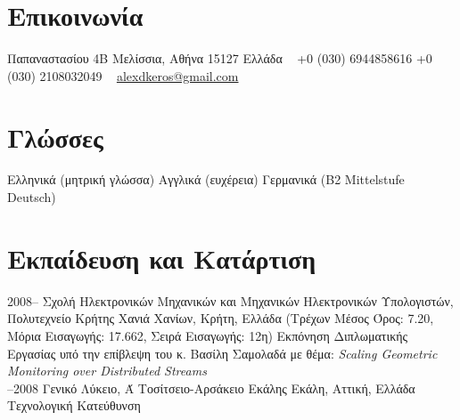 \documentclass[print]{keros-cv} %
\begin{document}


\begin{aside} %
\section{Επικοινωνία}
Παπαναστασίου 4Β
Μελίσσια, Αθήνα 15127
Ελλάδα
~
+0 (030) 6944858616
+0 (030) 2108032049
~
\href{mailto:alexdkeros@gmail.com}{alexdkeros@gmail.com}
\section{Γλώσσες}
Ελληνικά (μητρική γλώσσα)
Αγγλικά (ευχέρεια)
Γερμανικά (B2 Mittelstufe Deutsch)
\end{aside}


\section{Εκπαίδευση και Κατάρτιση}

\begin{entrylist}
\entry
{2008-- }
{Σχολή Ηλεκτρονικών Μηχανικών και Μηχανικών Ηλεκτρονικών Υπολογιστών, Πολυτεχνείο Κρήτης}
{Χανιά Χανίων, Κρήτη, Ελλάδα}
{(Τρέχων Μέσος Όρος: 7.20, Μόρια Εισαγωγής: 17.662, Σειρά Εισαγωγής: 12η)
Εκπόνηση Διπλωματικής Εργασίας υπό την επίβλεψη του κ. Βασίλη Σαμολαδά με θέμα: \emph{Scaling Geometric Monitoring over Distributed Streams}\\}
\entry
{--2008}
{Γενικό Λύκειο, Ά Τοσίτσειο-Αρσάκειο Εκάλης}
{Εκάλη, Αττική, Ελλάδα}
{Τεχνολογική Κατεύθυνση}
\end{entrylist}

\end{document}
